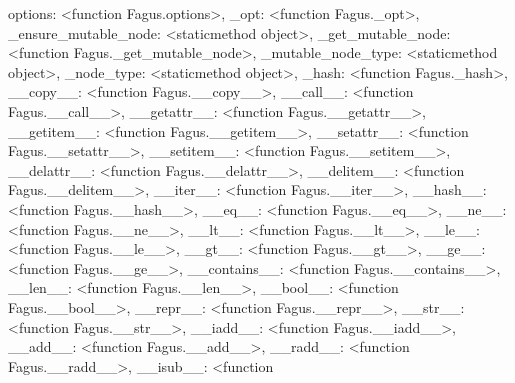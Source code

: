 \documentclass[a4paper,10pt,english]{sphinxmanual}
\begin{document}
\begin{fulllineitems}
\begin{fulllineitems}
\textquotesingle{}options\textquotesingle{}: \textless{}function Fagus.options\textgreater{}, \textquotesingle{}\_opt\textquotesingle{}: \textless{}function Fagus.\_opt\textgreater{}, \textquotesingle{}\_ensure\_mutable\_node\textquotesingle{}: \textless{}staticmethod object\textgreater{}, \textquotesingle{}\_get\_mutable\_node\textquotesingle{}: \textless{}function Fagus.\_get\_mutable\_node\textgreater{}, \textquotesingle{}\_mutable\_node\_type\textquotesingle{}: \textless{}staticmethod object\textgreater{}, \textquotesingle{}\_node\_type\textquotesingle{}: \textless{}staticmethod object\textgreater{}, \textquotesingle{}\_hash\textquotesingle{}: \textless{}function Fagus.\_hash\textgreater{}, \textquotesingle{}\_\_copy\_\_\textquotesingle{}: \textless{}function Fagus.\_\_copy\_\_\textgreater{}, \textquotesingle{}\_\_call\_\_\textquotesingle{}: \textless{}function Fagus.\_\_call\_\_\textgreater{}, \textquotesingle{}\_\_getattr\_\_\textquotesingle{}: \textless{}function Fagus.\_\_getattr\_\_\textgreater{}, \textquotesingle{}\_\_getitem\_\_\textquotesingle{}: \textless{}function Fagus.\_\_getitem\_\_\textgreater{}, \textquotesingle{}\_\_setattr\_\_\textquotesingle{}: \textless{}function Fagus.\_\_setattr\_\_\textgreater{}, \textquotesingle{}\_\_setitem\_\_\textquotesingle{}: \textless{}function Fagus.\_\_setitem\_\_\textgreater{}, \textquotesingle{}\_\_delattr\_\_\textquotesingle{}: \textless{}function Fagus.\_\_delattr\_\_\textgreater{}, \textquotesingle{}\_\_delitem\_\_\textquotesingle{}: \textless{}function Fagus.\_\_delitem\_\_\textgreater{}, \textquotesingle{}\_\_iter\_\_\textquotesingle{}: \textless{}function Fagus.\_\_iter\_\_\textgreater{}, \textquotesingle{}\_\_hash\_\_\textquotesingle{}: \textless{}function Fagus.\_\_hash\_\_\textgreater{}, \textquotesingle{}\_\_eq\_\_\textquotesingle{}: \textless{}function Fagus.\_\_eq\_\_\textgreater{}, \textquotesingle{}\_\_ne\_\_\textquotesingle{}: \textless{}function Fagus.\_\_ne\_\_\textgreater{}, \textquotesingle{}\_\_lt\_\_\textquotesingle{}: \textless{}function Fagus.\_\_lt\_\_\textgreater{}, \textquotesingle{}\_\_le\_\_\textquotesingle{}: \textless{}function Fagus.\_\_le\_\_\textgreater{}, \textquotesingle{}\_\_gt\_\_\textquotesingle{}: \textless{}function Fagus.\_\_gt\_\_\textgreater{}, \textquotesingle{}\_\_ge\_\_\textquotesingle{}: \textless{}function Fagus.\_\_ge\_\_\textgreater{}, \textquotesingle{}\_\_contains\_\_\textquotesingle{}: \textless{}function Fagus.\_\_contains\_\_\textgreater{}, \textquotesingle{}\_\_len\_\_\textquotesingle{}: \textless{}function Fagus.\_\_len\_\_\textgreater{}, \textquotesingle{}\_\_bool\_\_\textquotesingle{}: \textless{}function Fagus.\_\_bool\_\_\textgreater{}, \textquotesingle{}\_\_repr\_\_\textquotesingle{}: \textless{}function Fagus.\_\_repr\_\_\textgreater{}, \textquotesingle{}\_\_str\_\_\textquotesingle{}: \textless{}function Fagus.\_\_str\_\_\textgreater{}, \textquotesingle{}\_\_iadd\_\_\textquotesingle{}: \textless{}function Fagus.\_\_iadd\_\_\textgreater{}, \textquotesingle{}\_\_add\_\_\textquotesingle{}: \textless{}function Fagus.\_\_add\_\_\textgreater{}, \textquotesingle{}\_\_radd\_\_\textquotesingle{}: \textless{}function Fagus.\_\_radd\_\_\textgreater{}, \textquotesingle{}\_\_isub\_\_\textquotesingle{}: \textless{}function 
\end{fulllineitems}
\end{fulllineitems}
\end{document}
